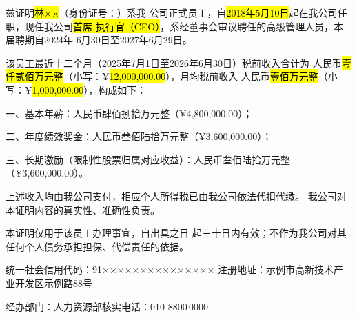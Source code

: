 \documentclass[zihao=-4]{ctexart}
\begin{document}

兹证明\hl{林××}（身份证号：）系我
公司正式员工，自\hl{2018年5月10日}起在我公司任职，现任我公司\hl{首席
执行官（CEO）}，系经董事会审议聘任的高级管理人员，本届聘期自2024年
6月30日至2027年6月29日。

该员工最近十二个月（2025年7月1日至2026年6月30日）税前收入合计为
人民币\hl{壹仟贰佰万元整}（小写：¥\hl{12,000,000.00}），月均税前收入
人民币\hl{壹佰万元整}（小写：¥\hl{1,000,000.00}），构成如下：

一、基本年薪：人民币肆佰捌拾万元整（¥4,800,000.00）；

二、年度绩效奖金：人民币叁佰陆拾万元整（¥3,600,000.00）；

三、长期激励（限制性股票归属对应收益）：人民币叁佰陆拾万元整
（¥3,600,000.00）。

上述收入均由我公司支付，相应个人所得税已由我公司依法代扣代缴。
我公司对本证明内容的真实性、准确性负责。

本证明仅用于该员工办理事宜，自出具之日
起三十日内有效；不作为我公司对其任何个人债务承担担保、代偿责任的依据。

\vspace{1.6\baselineskip}
\edSeal
{}

\vspace{0.8\baselineskip}
{\noindent 统一社会信用代码：91×××××××××××××××\quad
注册地址：示例市高新技术产业开发区示例路88号\par}
{\noindent 经办部门：人力资源部\quad 核实电话：010-8800\,0000\par}
\end{document}
